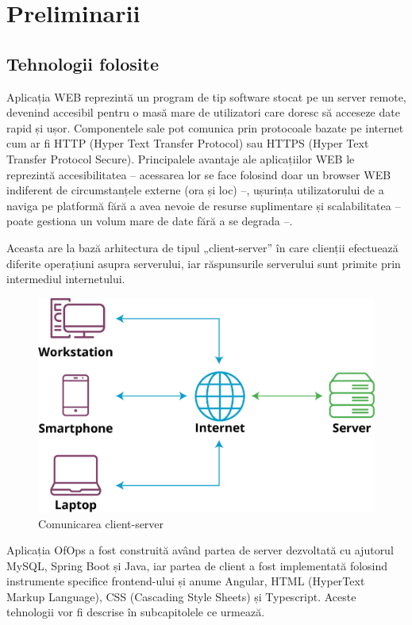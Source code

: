 \chapter{Preliminarii}

\section{Tehnologii folosite}
Aplicația WEB reprezintă un program de tip software stocat pe un server remote, devenind accesibil pentru o masă mare de utilizatori care doresc să acceseze date rapid și ușor. Componentele sale pot  comunica prin protocoale bazate pe internet cum ar fi HTTP (Hyper Text Transfer Protocol) sau HTTPS (Hyper Text Transfer Protocol Secure).\cite{citation1}  Principalele avantaje ale aplicațiilor WEB le reprezintă accesibilitatea – acessarea lor se face folosind doar un browser WEB indiferent de circumstanțele externe (ora și loc) –, ușurința utilizatorului de a naviga pe platformă fără a avea nevoie de resurse suplimentare și scalabilitatea – poate gestiona un volum mare de date fără a se degrada –.

Aceasta are la bază arhitectura de tipul „client-server” în care clienții efectuează diferite operațiuni asupra serverului, iar răspunsurile serverului sunt primite prin intermediul internetului. 

\begin{figure}[!htb]
    \centering
    \includegraphics[width=0.7\linewidth]{images/client-server-network.png}
    \caption{Comunicarea client-server}
    \label{fig:client-server}
\end{figure}

\newpage
Aplicația OfOps a fost construită având partea de server dezvoltată cu ajutorul MySQL, Spring Boot și Java, iar partea de client a fost implementată folosind instrumente specifice frontend-ului și anume Angular, HTML (HyperText Markup Language), CSS (Cascading Style Sheets) și Typescript. Aceste tehnologii vor fi descrise în subcapitolele ce urmează. 

